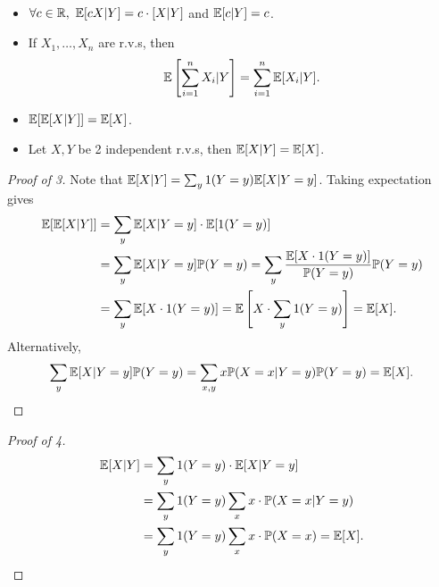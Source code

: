 \begin{proposition}\label{prop:Properties of conditional expectation}\ 
    \begin{itemize}
        \item $ \forall c\in \mathbb{R},\ {\mathbb{E}}[cX|Y]=c \cdot [X|Y] $ and $ {\mathbb{E}}[c|Y]=c $.
        \item If $ X_1,\dots,X_n $ are r.v.s, then 
        \[
            {\mathbb{E}}\left[ \sum_{i=1}^{n}X_i|Y \right] = \sum_{i=1}^{n} {\mathbb{E}}[X_i|Y].
        \]
        \item $ {\mathbb{E}}[{\mathbb{E}}[X|Y]]={\mathbb{E}}[X] $.
        \item Let $X,Y$ be 2 independent r.v.s, then $ {\mathbb{E}}[X|Y]={\mathbb{E}}[X] $.
    \end{itemize}
\end{proposition}
\begin{proof}[Proof of 3]
    Note that $ {\mathbb{E}}[X|Y]=\sum_{y} 1(Y=y){\mathbb{E}}[X|Y=y] $. Taking expectation gives 
    \begin{align*}
        {\mathbb{E}}[{\mathbb{E}}[X|Y]]&= \sum_{y} {\mathbb{E}}[X|Y=y] \cdot {\mathbb{E}}[1(Y=y)]\\
        &= \sum_{y} {\mathbb{E}}[X|Y=y] {\mathbb{P}}(Y=y) = \sum_{y} \frac{{\mathbb{E}}[X\cdot 1(Y=y)]}{{\mathbb{P}}(Y=y)}{\mathbb{P}}(Y=y)\\ 
        &= \sum_{y} {\mathbb{E}}[X\cdot 1(Y=y)] = {\mathbb{E}}\left[ X\cdot \sum_{y} 1(Y=y) \right] = {\mathbb{E}}[X].
    \end{align*}
    Alternatively, 
    \[
        \sum_{y} {\mathbb{E}}[X|Y=y] {\mathbb{P}}(Y=y) = \sum_{x,y} x{\mathbb{P}}(X=x|Y=y)\mathbb{P}(Y=y)={\mathbb{E}}[X].\qedhere
    \]
\end{proof}
\begin{proof}[Proof of 4]
    \begin{align*}
        {\mathbb{E}}[X|Y]&= \sum_{y} 1(Y=y) \cdot {\mathbb{E}}[X|Y=y]\\ 
        &= \sum_{y} 1(Y=y) \sum_{x} x \cdot {\mathbb{P}}(X=x|Y=y)\\
        &= \sum_{y} 1(Y=y) \sum_{x} x \cdot \mathbb{P}(X=x) = {\mathbb{E}}[X].\qedhere
    \end{align*}
\end{proof}